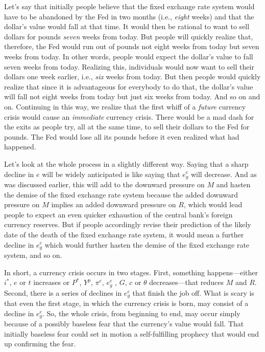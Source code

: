\documentclass[
  letterpaper,
]{book}
\theoremstyle{plain}
\theoremstyle{remark}
\begin{document}
Let's say that initially people believe that the fixed exchange rate
system would have to be abandoned by the Fed in two months (i.e.,
\emph{eight} weeks) and that the dollar's value would fall at that time.
It would then be rational to want to sell dollars for pounds
\emph{seven} weeks from today. But people will quickly realize that,
therefore, the Fed would run out of pounds not eight weeks from today
but seven weeks from today. In other words, people would expect the
dollar's value to fall seven weeks from today. Realizing this,
individuals would now want to sell their dollars one week earlier, i.e.,
\emph{six} weeks from today. But then people would quickly realize that
since it is advantageous for everybody to do that, the dollar's value
will fall not eight weeks from today but just six weeks from today. And
so on and on. Continuing in this way, we realize that the first whiff of
a \emph{future} currency crisis would cause an \emph{immediate} currency
crisis. There would be a mad dash for the exits as people try, all at
the same time, to sell their dollars to the Fed for pounds. The Fed
would lose all its pounds before it even realized what had happened.

Let's look at the whole process in a slightly different way. Saying that
a sharp decline in \(e\) will be widely anticipated is like saying that
\(e_g^e\) will decrease. And as was discussed earlier, this will add to
the downward pressure on \(M\) and hasten the demise of the fixed
exchange rate system because the added downward pressure on \(M\)
implies an added downward pressure on \(R\), which would lead people to
expect an even quicker exhaustion of the central bank's foreign currency
reserves. But if people accordingly revise their prediction of the
likely date of the death of the fixed exchange rate system, it would
mean a further decline in \(e_g^e\) which would further hasten the
demise of the fixed exchange rate system, and so on.

In short, a currency crisis occurs in two stages. First, something
happens---either \(i^*\), \(e\) or \(t\) increases or \(P^*\), \(Y^p\),
\(\pi^e\), \(e_g^e\) , \(G\), \(c\) or \(\theta\) decreases---that
reduces \(M\) and \(R\). Second, there is a series of declines in
\(e_g^e\) that finish the job off. What is scary is that even the first
stage, in which the currency crisis is born, may consist of a decline in
\(e_g^e\). So, the whole crisis, from beginning to end, may occur simply
because of a possibly baseless fear that the currency's value would
fall. That initially baseless fear could set in motion a self-fulfilling
prophecy that would end up confirming the fear.
\end{document}
